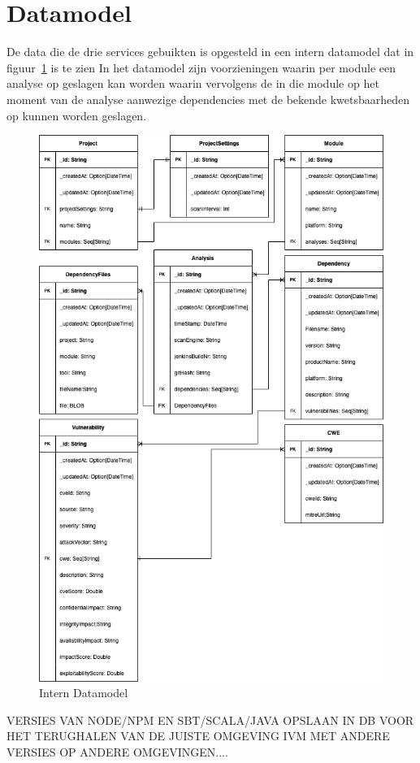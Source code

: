\section{Datamodel}\label{subsec:datamodel}
De data die de drie services gebuikten is opgesteld in een intern datamodel dat in figuur~\ref{fig:SOUP-SoupApiDm} is te zien In het datamodel zijn voorzieningen waarin per module een analyse op geslagen kan worden waarin vervolgens de in die module op het moment van de analyse aanwezige dependencies met de bekende kwetsbaarheden op kunnen worden geslagen.
\begin{figure}[H]
    \myfloatalign
    \includegraphics[width=12cm]{gfx/SOUPAPI-SOUPAPI DM}
    \caption{Intern Datamodel}
    \label{fig:SOUP-SoupApiDm}
\end{figure}

VERSIES VAN NODE/NPM EN SBT/SCALA/JAVA OPSLAAN IN DB VOOR HET TERUGHALEN VAN DE JUISTE OMGEVING IVM MET ANDERE VERSIES OP ANDERE OMGEVINGEN....

